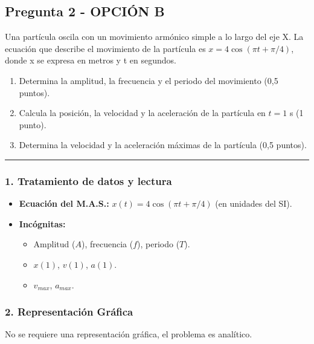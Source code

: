 \newpage

\subsection{Pregunta 2 - OPCIÓN B}
\label{subsec:2B_2008_sep_ext}

\begin{cajaenunciado}
Una partícula oscila con un movimiento armónico simple a lo largo del eje X. La ecuación que describe el movimiento de la partícula es $x=4\cos(\pi t+\pi/4)$, donde x se expresa en metros y t en segundos.
\begin{enumerate}
    \item Determina la amplitud, la frecuencia y el periodo del movimiento (0,5 puntos).
    \item Calcula la posición, la velocidad y la aceleración de la partícula en $t=1$ s (1 punto).
    \item Determina la velocidad y la aceleración máximas de la partícula (0,5 puntos).
\end{enumerate}
\end{cajaenunciado}
\hrule

\subsubsection*{1. Tratamiento de datos y lectura}
\begin{itemize}
    \item \textbf{Ecuación del M.A.S.:} $x(t) = 4\cos(\pi t + \pi/4)$ (en unidades del SI).
    \item \textbf{Incógnitas:}
        \begin{itemize}
            \item Amplitud ($A$), frecuencia ($f$), periodo ($T$).
            \item $x(1)$, $v(1)$, $a(1)$.
            \item $v_{max}$, $a_{max}$.
        \end{itemize}
\end{itemize}

\subsubsection*{2. Representación Gráfica}
No se requiere una representación gráfica, el problema es analítico.

